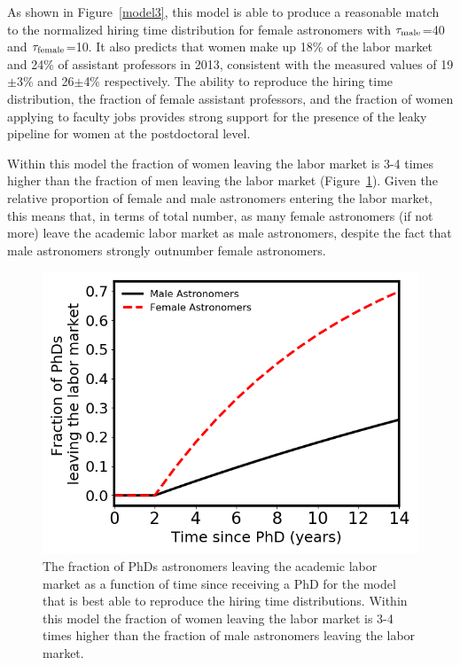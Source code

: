 \documentclass[modern]{aastex62}
\begin{document}
As shown in Figure~\ref{model3}, this model is able to produce a reasonable match to the normalized hiring time distribution for female astronomers with $\tau_{\rm male}$=40 and $\tau_{\rm female}$=10. It also predicts that women make up 18\% of the labor market and 24\% of assistant professors in 2013, consistent with the measured values of 19$\pm$3\% \citep{tho15} and 26$\pm$4\% \citep{hug14} respectively. The ability to reproduce the hiring time distribution, the fraction of female assistant professors, and the fraction of women applying to faculty jobs provides strong support for the presence of the leaky pipeline for women at the postdoctoral level. 

Within this model the fraction of women leaving the labor market is 3-4 times higher than the fraction of men leaving the labor market (Figure~\ref{df_model3}). Given the relative proportion of female and male astronomers entering the labor market, this means that, in terms of total number, as many female astronomers (if not more) leave the academic labor market as male astronomers, despite the fact that male astronomers strongly outnumber female astronomers. 

\begin{figure}[!hbt]
\center
\includegraphics[scale=.6]{df_model3.png}
\caption{The fraction of PhDs astronomers leaving the academic labor market as a function of time since receiving a PhD for the model that is best able to reproduce the hiring time distributions. Within this model the fraction of women leaving the labor market is 3-4 times higher than the fraction of male astronomers leaving the labor market. \label{df_model3}}
\end{figure}
\end{document}
